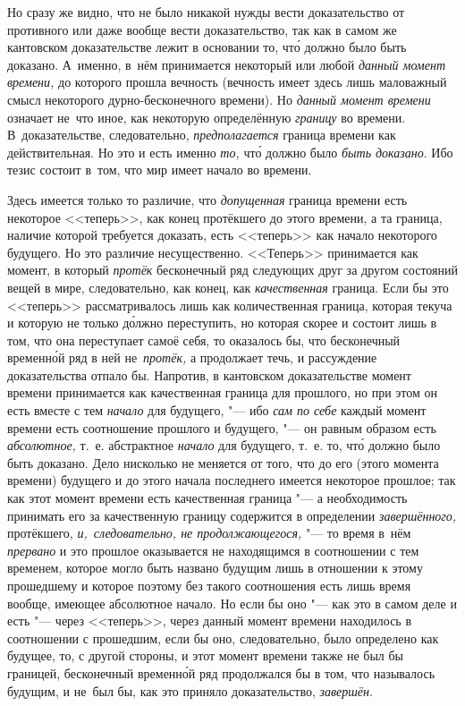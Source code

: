 Но сразу же видно, что не было никакой нужды вести доказательство от противного
или даже вообще вести доказательство, так как в самом же кантовском
доказательстве лежит в основании то, чт\'{о} должно было быть доказано. А~именно,
в~нём принимается некоторый или любой {\em данный момент времени,} до которого
прошла вечность (вечность имеет здесь лишь маловажный смысл некоторого
дурно-бесконечного времени). Но {\em данный момент времени} означает
не~что иное, как некоторую определённую {\em границу} во времени.
В~доказательстве, следовательно, {\em предполагается} граница времени как
действительная. Но это и есть именно {\em то,} чт\'{о} должно было
{\em быть доказано}. Ибо тезис состоит в~том, что мир имеет начало во времени.

Здесь имеется только то различие, что {\em допущенная} граница времени есть
некоторое <<теперь>>, как конец протёкшего до этого времени, а та граница,
наличие которой требуется доказать, есть <<теперь>> как начало некоторого
будущего. Но это различие несущественно. <<Теперь>> принимается как момент,
в который {\em протёк} бесконечный ряд следующих друг за другом состояний вещей
в мире, следовательно, как конец, как {\em качественная} граница. Если бы это
<<теперь>> рассматривалось лишь как количественная граница, которая
текуча и которую не только д\'{о}лжно переступить, но которая скорее и
состоит лишь в том, что она переступает самоё себя, то оказалось бы, что бесконечный
временн\'{о}й ряд в ней не~{\em протёк,} а продолжает течь, и рассуждение
доказательства отпало бы. Напротив, в кантовском доказательстве момент времени
принимается как качественная граница для прошлого, но при этом он есть вместе
с тем {\em начало} для будущего, "--- ибо {\em сам по себе} каждый момент
времени есть соотношение прошлого и будущего, "--- он равным образом есть
{\em абсолютное,} т.~е. абстрактное {\em начало} для будущего, т.~е. то, чт\'{о}
должно было быть доказано. Дело нисколько не меняется от того, что до его
(этого момента времени) будущего и до этого начала последнего имеется некоторое
прошлое; так как этот момент времени есть качественная граница "--- а
необходимость принимать его за качественную границу содержится в определении
{\em завершённого,} протёкшего, {\em и,~следовательно, не продолжающегося,}
"--- то время в~нём {\em прервано} и это прошлое оказывается не находящимся
в соотношении с тем временем, которое могло быть названо будущим лишь в отношении
к этому прошедшему и которое поэтому без такого соотношения есть лишь время
вообще, имеющее абсолютное начало. Но если бы оно "--- как это в самом деле
и есть "--- через <<теперь>>, через данный момент времени находилось
в соотношении с прошедшим, если бы оно, следовательно, было определено как
будущее, то, с другой стороны, и этот момент времени также не был бы границей,
бесконечный временн\'{о}й ряд продолжался бы в том, что называлось будущим, и
не~был бы, как это приняло доказательство, {\em завершён}.

